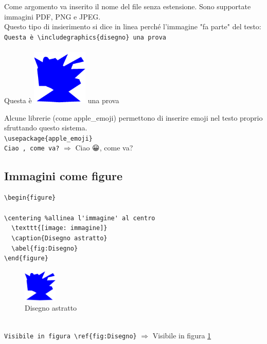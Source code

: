   Come argomento va inserito il nome del file senza estensione. Sono supportate immagini PDF, PNG e JPEG.\\
  Questo tipo di insierimento si dice in linea perché l'immagine "fa parte" del testo:\\
  \texttt{Questa è \textbackslash includegraphics\{disegno\} una prova}\\~\\
  Questa è \includegraphics[height=100px]{img/disegno} una prova\par
  Alcune librerie (come apple\_emoji) permettono di inserire emoji nel testo proprio sfruttando questo sistema.\\
  \verb!\usepackage{apple_emoji}!\\
  \texttt{Ciao \smiley, come va?} $\Rightarrow$ Ciao 😀, come va?
  \subsection{Immagini come figure}
  \verb!\begin{figure}                       !\\
	\\\verb!\centering %allinea l'immagine' al centro!\\
  \verb!  \texttt{[image: immagine]}         !\\
  \verb!  \caption{Disegno astratto}         !\\
  \verb!  \abel{fig:Disegno}                 !\\
  \verb!\end{figure}                         !\\
  \begin{figure}[!ht]\centering%
    \includegraphics[height=60px]{img/disegno}%
    \caption{Disegno astratto}%
    \label{fig:Disegno}%
  \end{figure}\\%
  \texttt{Visibile in figura \textbackslash ref\{fig:Disegno\}} $\Rightarrow$ Visibile in figura \ref{fig:Disegno}

